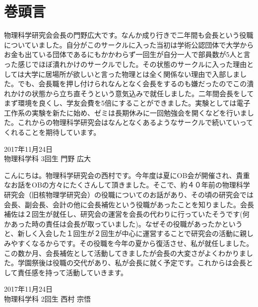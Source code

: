 \documentclass[10pt,b5paper,papersize]{jsbook}
\begin{document}
\frontmatter %

%
\chapter*{巻頭言}
物理科学研究会会長の門野広大です。なんか成り行きで二年間も会長という役職についていました。自分がこのサークルに入った当初は学術公認団体で大学からお金も出ている団体であるにもかかわらず一回生が自分一人で部員数が5人と言った感じでほぼ潰れかけのサークルでした。その状態のサークルに入った理由としては大学に居場所が欲しいと言った物理とは全く関係ない理由で入部しました。でも、会長職を押し付けられなんとなく会長をするのも嫌だったのでこの潰れかけの状態から立ち直そうという意気込みで就任しました。二年間会長をしてまず環境を良くし、学友会費を5倍にすることができました。実験としては電子工作系の実験を新たに始め、ゼミは長期休みに一回勉強会を開くなどを行いました。これからの物理科学研究会はなんとなくあるようなサークルで続いていってくれることを期待しています。
\begin{flushright}
  2017年11月24日\\
  物理科学科 3回生 門野 広大
\end{flushright}

\vspace{3zw}
こんにちは。物理科学研究会の西村です。今年度は夏にOB会が開催され、貴重なお話をOBの方々にたくさんして頂きました。そこで、約４０年前の物理科学研究会（旧核物理学研究会）の役職についてのお話があり、その頃の研究会では会長、副会長、会計の他に会長補佐という役職があったことを知りました。会長補佐は２回生が就任し、研究会の運営を会長の代わりに行っていたそうです(何かあった時の責任は会長が取っていました)。なぜその役職があったかというと、新しく入会した１回生が２回生が中心に運営することで研究会の活動に親しみやすくなるからです。その役職を今年の夏から復活させ、私が就任しました。この数か月、会長補佐として活動してきましたが会長の大変さがよくわかりました。学園祭後は役職の交代があり、私が会長に就く予定です。これからは会長として責任感を持って活動していきます。
\begin{flushright}
  2017年11月24日\\
  物理科学科 2回生 西村 宗悟
\end{flushright}


%
\tableofcontents %
\mainmatter %
%


%
 \clearpage
 \clearpage
 \clearpage
 \clearpage
 \clearpage
\end{document}
